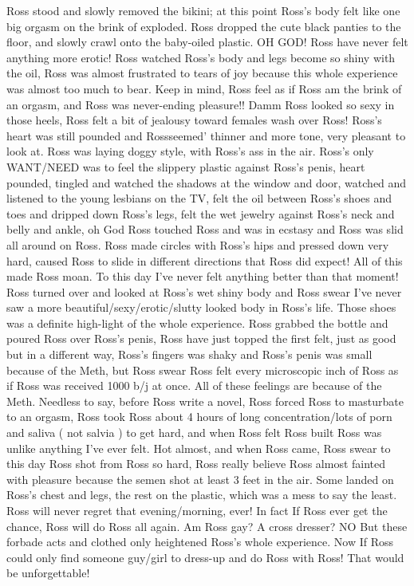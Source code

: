 \documentclass[12pt]{book}
\begin{document}
Ross stood and slowly removed the bikini; at this point Ross's body felt like one big orgasm on the brink of exploded. Ross dropped the cute black panties to the floor, and slowly crawl onto the baby-oiled plastic. OH GOD! Ross have never felt anything more erotic! Ross watched Ross's body and legs become so shiny with the oil, Ross was almost frustrated to tears of joy because this whole experience was almost too much to bear. Keep in mind, Ross feel as if Ross am the brink of an orgasm, and Ross was never-ending pleasure!! Damm Ross looked so sexy in those heels, Ross felt a bit of jealousy toward females wash over Ross! Ross's heart was still pounded and Rossseemed' thinner and more tone, very pleasant to look at. Ross was laying doggy style, with Ross's ass in the air. Ross's only WANT/NEED was to feel the slippery plastic against Ross's penis, heart pounded, tingled and watched the shadows at the window and door, watched and listened to the young lesbians on the TV, felt the oil between Ross's shoes and toes and dripped down Ross's legs, felt the wet jewelry against Ross's neck and belly and ankle, oh God Ross touched Ross and was in ecstasy and Ross was slid all around on Ross. Ross made circles with Ross's hips and pressed down very hard, caused Ross to slide in different directions that Ross did expect! All of this made Ross moan. To this day I've never felt anything better than that moment! Ross turned over and looked at Ross's wet shiny body and Ross swear I've never saw a more beautiful/sexy/erotic/slutty looked body in Ross's life. Those shoes was a definite high-light of the whole experience. Ross grabbed the bottle and poured Ross over Ross's penis, Ross have just topped the first felt, just as good but in a different way, Ross's fingers was shaky and Ross's penis was small because of the Meth, but Ross swear Ross felt every microscopic inch of Ross as if Ross was received 1000 b/j at once. All of these feelings are because of the Meth. Needless to say, before Ross write a novel, Ross forced Ross to masturbate to an orgasm, Ross took Ross about 4 hours of long concentration/lots of porn and saliva ( not salvia ) to get hard, and when Ross felt Ross built Ross was unlike anything I've ever felt. Hot almost, and when Ross came, Ross swear to this day Ross shot from Ross so hard, Ross really believe Ross almost fainted with pleasure because the semen shot at least 3 feet in the air. Some landed on Ross's chest and legs, the rest on the plastic, which was a mess to say the least. Ross will never regret that evening/morning, ever! In fact If Ross ever get the chance, Ross will do Ross all again. Am Ross gay? A cross dresser? NO But these forbade acts and clothed only heightened Ross's whole experience. Now If Ross could only find someone guy/girl to dress-up and do Ross with Ross! That would be unforgettable!
\end{document}
